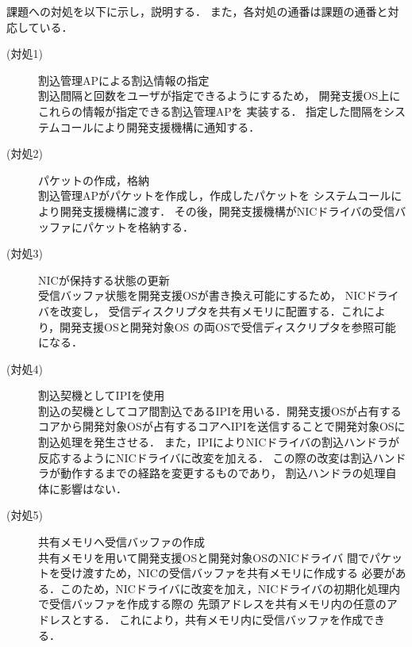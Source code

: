 \documentclass[submit,techreq,noauthor,dvipdfmx]{ipsj}
\begin{document}
課題への対処を以下に示し，説明する．
また，各対処の通番は課題の通番と対応している．

\begin{description}
    \item[(対処1)] 割込管理APによる割込情報の指定\\
        割込間隔と回数をユーザが指定できるようにするため，
        開発支援OS上にこれらの情報が指定できる割込管理APを
        実装する．
        指定した間隔をシステムコールにより開発支援機構に通知する．
    \item[(対処2)] パケットの作成，格納\\
        割込管理APがパケットを作成し，作成したパケットを
        システムコールにより開発支援機構に渡す．
        その後，開発支援機構がNICドライバの受信バッファにパケットを格納する．
    \item[(対処3)] NICが保持する状態の更新\\
        受信バッファ状態を開発支援OSが書き換え可能にするため，
        NICドライバを改変し，
        受信ディスクリプタを共有メモリに配置する．これにより，開発支援OSと開発対象OS
        の両OSで受信ディスクリプタを参照可能になる．
    \item[(対処4)] 割込契機としてIPIを使用\\
        割込の契機としてコア間割込であるIPIを用いる．開発支援OSが占有する
        コアから開発対象OSが占有するコアへIPIを送信することで開発対象OSに割込処理を発生させる．
        また，IPIによりNICドライバの割込ハンドラが反応するようにNICドライバに改変を加える．
        この際の改変は割込ハンドラが動作するまでの経路を変更するものであり，
        割込ハンドラの処理自体に影響はない．
    \item[(対処5)] 共有メモリへ受信バッファの作成\\
        共有メモリを用いて開発支援OSと開発対象OSのNICドライバ
        間でパケットを受け渡すため，NICの受信バッファを共有メモリに作成する
        必要がある．このため，NICドライバに改変を加え，NICドライバの初期化処理内で受信バッファを作成する際の
        先頭アドレスを共有メモリ内の任意のアドレスとする．
        これにより，共有メモリ内に受信バッファを作成できる．
\end{description}

\end{document}
